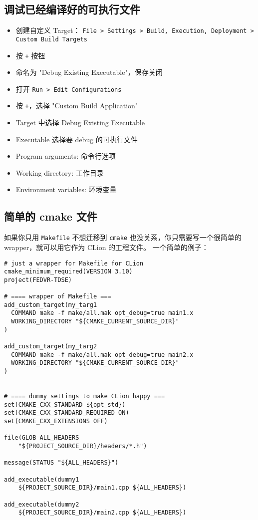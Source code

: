 \subsection{调试已经编译好的可执行文件}\label{sub_CLionN_1}
\begin{itemize}
\item 创建自定义 Target： \verb`File > Settings > Build, Execution, Deployment > Custom Build Targets`
\item 按 \verb`+` 按钮
\item 命名为 "Debug Existing Executable"，保存关闭
\item 打开 \verb`Run > Edit Configurations`
\item 按 \verb`+`，选择 "Custom Build Application"
\item Target 中选择 Debug Existing Executable
\item Executable 选择要 debug 的可执行文件
\item Program arguments: 命令行选项
\item Working directory: 工作目录
\item Environment variables: 环境变量
\end{itemize}

\subsection{简单的 cmake 文件}
如果你只用 \verb`Makefile` 不想迁移到 \verb`cmake` 也没关系，你只需要写一个很简单的 wrapper，就可以用它作为 CLion 的工程文件。 一个简单的例子：
\begin{lstlisting}[language=none]
# just a wrapper for Makefile for CLion
cmake_minimum_required(VERSION 3.10)
project(FEDVR-TDSE)

# ==== wrapper of Makefile ===
add_custom_target(my_targ1
  COMMAND make -f make/all.mak opt_debug=true main1.x
  WORKING_DIRECTORY "${CMAKE_CURRENT_SOURCE_DIR}"
)

add_custom_target(my_targ2
  COMMAND make -f make/all.mak opt_debug=true main2.x
  WORKING_DIRECTORY "${CMAKE_CURRENT_SOURCE_DIR}"
)


# ==== dummy settings to make CLion happy ===
set(CMAKE_CXX_STANDARD ${opt_std})
set(CMAKE_CXX_STANDARD_REQUIRED ON)
set(CMAKE_CXX_EXTENSIONS OFF)

file(GLOB ALL_HEADERS
    "${PROJECT_SOURCE_DIR}/headers/*.h")

message(STATUS "${ALL_HEADERS}")

add_executable(dummy1
    ${PROJECT_SOURCE_DIR}/main1.cpp ${ALL_HEADERS})

add_executable(dummy2
    ${PROJECT_SOURCE_DIR}/main2.cpp ${ALL_HEADERS})
\end{lstlisting}


